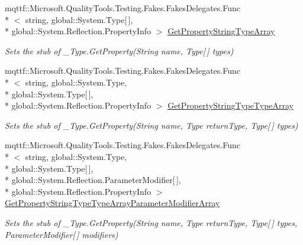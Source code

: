 \begin{DoxyCompactItemize}
mqttf\-::\-Microsoft.\-Quality\-Tools.\-Testing.\-Fakes.\-Fakes\-Delegates.\-Func\\*
$<$ string, global\-::\-System.\-Type\mbox{[}$\,$\mbox{]}, \\*
global\-::\-System.\-Reflection.\-Property\-Info $>$ \hyperlink{class_system_1_1_runtime_1_1_interop_services_1_1_fakes_1_1_stub___type_af5d702b35923f1f39b39fb231deada16}{Get\-Property\-String\-Type\-Array}
\begin{DoxyCompactList}\small\item\em Sets the stub of \-\_\-\-Type.\-Get\-Property(\-String name, Type\mbox{[}$\,$\mbox{]} types)\end{DoxyCompactList}\item 
mqttf\-::\-Microsoft.\-Quality\-Tools.\-Testing.\-Fakes.\-Fakes\-Delegates.\-Func\\*
$<$ string, global\-::\-System.\-Type, \\*
global\-::\-System.\-Type\mbox{[}$\,$\mbox{]}, \\*
global\-::\-System.\-Reflection.\-Property\-Info $>$ \hyperlink{class_system_1_1_runtime_1_1_interop_services_1_1_fakes_1_1_stub___type_a3c292feb9adac737398f56d06498bf36}{Get\-Property\-String\-Type\-Type\-Array}
\begin{DoxyCompactList}\small\item\em Sets the stub of \-\_\-\-Type.\-Get\-Property(\-String name, Type return\-Type, Type\mbox{[}$\,$\mbox{]} types)\end{DoxyCompactList}\item 
mqttf\-::\-Microsoft.\-Quality\-Tools.\-Testing.\-Fakes.\-Fakes\-Delegates.\-Func\\*
$<$ string, global\-::\-System.\-Type, \\*
global\-::\-System.\-Type\mbox{[}$\,$\mbox{]}, \\*
global\-::\-System.\-Reflection.\-Parameter\-Modifier\mbox{[}$\,$\mbox{]}, \\*
global\-::\-System.\-Reflection.\-Property\-Info $>$ \hyperlink{class_system_1_1_runtime_1_1_interop_services_1_1_fakes_1_1_stub___type_a7c16f7106283e37e28aca76fcf18f25a}{Get\-Property\-String\-Type\-Type\-Array\-Parameter\-Modifier\-Array}
\begin{DoxyCompactList}\small\item\em Sets the stub of \-\_\-\-Type.\-Get\-Property(\-String name, Type return\-Type, Type\mbox{[}$\,$\mbox{]} types, Parameter\-Modifier\mbox{[}$\,$\mbox{]} modifiers)\end{DoxyCompactList}\item 

\end{DoxyCompactItemize}
